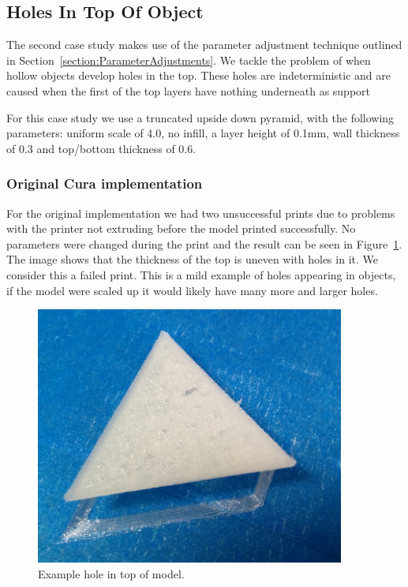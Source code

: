 \documentclass[11pt]{report} %
\begin{document}
\subsection{Holes In Top Of Object}
The second case study makes use of the parameter adjustment technique outlined in Section~\ref{section:ParameterAdjustments}. We tackle the problem of when hollow objects develop holes in the top. These holes are indeterministic and are caused when the first of the top layers have nothing underneath as support

For this case study we use a truncated upside down pyramid, with the following parameters: uniform scale of 4.0, no infill, a layer height of 0.1mm, wall thickness of 0.3 and top/bottom thickness of 0.6. 

\subsubsection{Original Cura implementation}

For the original implementation we had two unsuccessful prints due to problems with the printer not extruding before the model printed successfully. No parameters were changed during the print and the result can be seen in Figure~\ref{figure:PyramidOld1}. The image shows that the thickness of the top is uneven with holes in it. We consider this a failed print. This is a mild example of holes appearing in objects, if the model were scaled up it would likely have many more and larger holes. 

\begin{figure}[H]
  \centering
  \includegraphics[width=4in]{PyramidOld1.png}
  \caption{Example hole in top of model.}
  \label{figure:PyramidOld1}
\end{figure}
\end{document}
